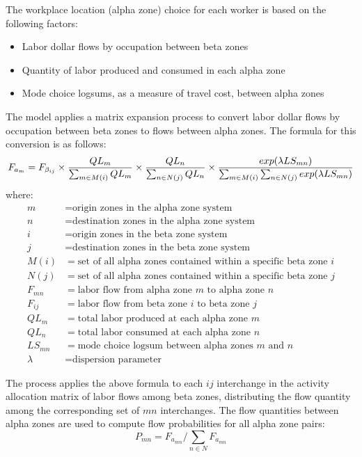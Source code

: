 The workplace location (alpha zone) choice for each worker is based on the following factors:
\begin{itemize}
\item Labor dollar flows by occupation between beta zones
\item Quantity of labor produced and consumed in each alpha zone
\item Mode choice logsums, as a measure of travel cost, between alpha zones
\end{itemize}

\noindent The model applies a matrix expansion process to convert labor dollar flows by occupation between beta zones to flows between alpha zones. The formula for this conversion is as follows:
\begin{equation}
F_{a_m} = F_{\beta_{ij}} \times {{QL_m} \over {\sum_{m \in M(i)} QL_m}} \times {QL_n \over {\sum_{n \in N(j)} QL_n}} \times {{exp(\lambda LS_{mn})} \over {\sum_{m \in M(i)} \sum_{n \in N(j)}exp({\lambda LS_{mn}})}}
\end{equation}
where:
\begin{align*}
m &= \text{origin zones in the alpha zone system} \\
n &= \text{destination zones in the alpha zone system} \\
i &= \text{origin zones in the beta zone system} \\
j &= \text{destination zones in the beta zone system} \\
M(i) &= \text{set of all alpha zones contained within a specific beta zone $i$} \\
N(j) &= \text{set of all alpha zones contained within a specific beta zone $j$} \\
F_{mn} &= \text{labor flow from alpha zone $m$ to alpha zone $n$} \\ 
F_{ij} &= \text{labor flow from beta zone $i$ to beta zone $j$} \\
QL_m &= \text{total labor produced at each alpha zone $m$} \\
QL_n &= \text{total labor consumed at each alpha zone $n$} \\
LS_{mn} &= \text{mode choice logsum between alpha zones $m$ and $n$} \\
\lambda &= \text{dispersion parameter} 
\end{align*}

The process applies the above formula to each $ij$ interchange in the activity allocation matrix of labor flows among beta zones, distributing the flow quantity among the corresponding set of $mn$ interchanges. The flow quantities between alpha zones are used to compute flow probabilities for all alpha zone pairs:
\begin{equation}
P_{mn} = F_{a_{mn}} / \sum_{n \in N} F_{a_{mn}}
\end{equation}

